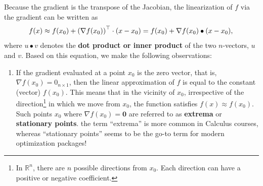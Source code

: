Because the gradient is the transpose of the Jacobian, the linearization of $f$ via the gradient can be written as 
\begin{equation}
\label{eq:LinearizeViaGradientDotProduct}
    f(x) \approx f(x_0) + \left( \nabla f(x_0) \right)^\top \cdot (x - x_0) = f(x_0) +\nabla f(x_0) \bullet (x - x_0),\\
\end{equation}
where $u \bullet v$ denotes the \textbf{dot product or inner product} of the two $n$-vectors, $u$ and $v$. Based on this equation, we make the following observations:
\begin{enumerate}
\renewcommand{\labelenumi}{(\alph{enumi})}
\setlength{\itemsep}{.2cm}

\item If the gradient evaluated at a point \( x_0 \) is the zero vector, that is, \( \nabla f(x_0) = {0}_{n \times 1} \), then the linear approximation of \( f \) is equal to the constant (vector) $f(x_0)$. This means that  in the vicinity of \( x_0 \), irrespective of the direction\footnote{In \( \mathbb{R}^n \), there are \( n \) possible directions from \( x_0 \). Each direction can have a positive or negative coefficient.} in which we move from \( x_0 \), the function satisfies $f(x) \approx f(x_0)$. Such points \( x_0 \) where \( \nabla f(x_0) = \mathbf{0} \) are referred to as \textbf{extrema} or \textbf{stationary points}. the term ``extrema'' is more common in Calculus courses, whereas ``stationary points'' seems to be the go-to term for modern optimization packages! \\

\end{enumerate}
